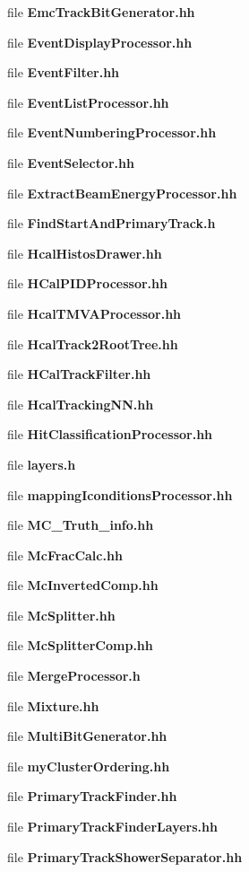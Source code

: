 \begin{DoxyCompactItemize}
file {\bfseries Emc\-Track\-Bit\-Generator.\-hh}
\item 
file {\bfseries Event\-Display\-Processor.\-hh}
\item 
file {\bfseries Event\-Filter.\-hh}
\item 
file {\bfseries Event\-List\-Processor.\-hh}
\item 
file {\bfseries Event\-Numbering\-Processor.\-hh}
\item 
file {\bfseries Event\-Selector.\-hh}
\item 
file {\bfseries Extract\-Beam\-Energy\-Processor.\-hh}
\item 
file {\bfseries Find\-Start\-And\-Primary\-Track.\-h}
\item 
file {\bfseries Hcal\-Histos\-Drawer.\-hh}
\item 
file {\bfseries H\-Cal\-P\-I\-D\-Processor.\-hh}
\item 
file {\bfseries Hcal\-T\-M\-V\-A\-Processor.\-hh}
\item 
file {\bfseries Hcal\-Track2\-Root\-Tree.\-hh}
\item 
file {\bfseries H\-Cal\-Track\-Filter.\-hh}
\item 
file {\bfseries Hcal\-Tracking\-N\-N.\-hh}
\item 
file {\bfseries Hit\-Classification\-Processor.\-hh}
\item 
file {\bfseries layers.\-h}
\item 
file {\bfseries mapping\-Iconditions\-Processor.\-hh}
\item 
file {\bfseries M\-C\-\_\-\-Truth\-\_\-info.\-hh}
\item 
file {\bfseries Mc\-Frac\-Calc.\-hh}
\item 
file {\bfseries Mc\-Inverted\-Comp.\-hh}
\item 
file {\bfseries Mc\-Splitter.\-hh}
\item 
file {\bfseries Mc\-Splitter\-Comp.\-hh}
\item 
file {\bfseries Merge\-Processor.\-h}
\item 
file {\bfseries Mixture.\-hh}
\item 
file {\bfseries Multi\-Bit\-Generator.\-hh}
\item 
file {\bfseries my\-Cluster\-Ordering.\-hh}
\item 
file {\bfseries Primary\-Track\-Finder.\-hh}
\item 
file {\bfseries Primary\-Track\-Finder\-Layers.\-hh}
\item 
file {\bfseries Primary\-Track\-Shower\-Separator.\-hh}

\end{DoxyCompactItemize}
